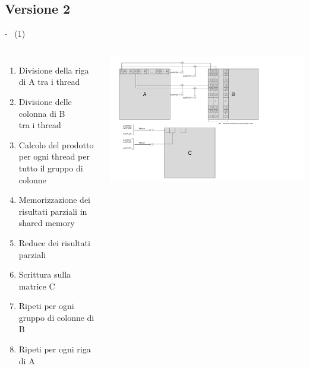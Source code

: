 \documentclass[compress]{beamer}
\begin{document}
\subsection{Versione 2}
\begin{frame}{\secname \text{ }- \subsecname\ (1)}
    \begin{columns}
        \begin{minipage}[b]{1\textwidth}
            \begin{enumerate}
                \item Divisione della riga di A tra i thread
                \item Divisione delle colonna di B \\tra i thread
                \item Calcolo del prodotto per ogni thread per tutto il gruppo di colonne
                \item Memorizzazione dei risultati parziali in shared memory
                \item Reduce dei risultati parziali 
                \item Scrittura sulla matrice C
                \item Ripeti per ogni gruppo di colonne di B
                \item Ripeti per ogni riga di A
            \end{enumerate}
        \end{minipage}
        \begin{minipage}{1.25\textwidth}
            \begin{adjustbox}{margin=0cm 0cm 0cm 0cm, center} %
                \includegraphics[width=1.2\textwidth]{resources/cuda_scheme_v2.png}
            \end{adjustbox}
        \end{minipage}
        
    \end{columns}
\end{frame}
\end{document}
